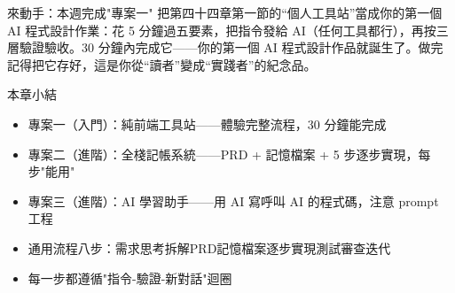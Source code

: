 \begin{tcbpractice}{來動手：本週完成"專案一"}
把第四十四章第一節的“個人工具站”當成你的第一個 AI 程式設計作業：花 5 分鐘過五要素，把指令發給 AI（任何工具都行），再按三層驗證驗收。30 分鐘內完成它——你的第一個 AI 程式設計作品就誕生了。做完記得把它存好，這是你從“讀者”變成“實踐者”的紀念品。

\end{tcbpractice}

\begin{tcbsummary}{本章小結}
\begin{itemize}
  \item 專案一（入門）：純前端工具站——體驗完整流程，30 分鐘能完成
  \item 專案二（進階）：全棧記帳系統——PRD + 記憶檔案 + 5 步逐步實現，每步"能用"
  \item 專案三（進階）：AI 學習助手——用 AI 寫呼叫 AI 的程式碼，注意 prompt 工程
  \item 通用流程八步：需求思考拆解PRD記憶檔案逐步實現測試審查迭代
  \item 每一步都遵循"指令-驗證-新對話"迴圈
\end{itemize}

\end{tcbsummary}
